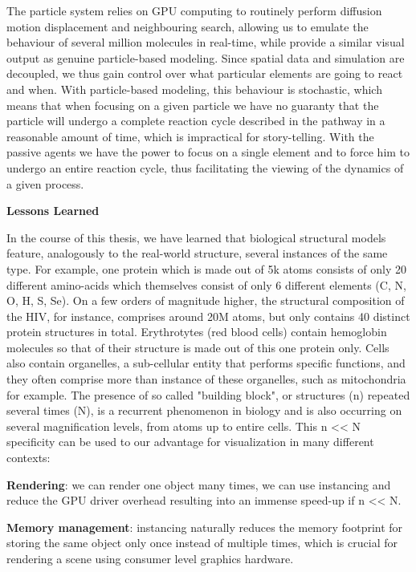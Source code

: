 The particle system relies on GPU computing to routinely perform diffusion motion displacement and neighbouring search, allowing us to emulate the behaviour of several million molecules in real-time, while provide a similar visual output as genuine particle-based modeling.
Since spatial data and simulation are decoupled, we thus gain control over what particular elements are going to react and when.
With particle-based modeling, this behaviour is stochastic, which means that when focusing on a given particle we have no guaranty that the particle will undergo a complete reaction cycle described in the pathway in a reasonable amount of time, which is impractical for story-telling.
With the passive agents we have the power to focus on a single element and to force him to undergo an entire reaction cycle, thus facilitating the viewing of the dynamics of a given process.

\textbf{Lessons Learned}

In the course of this thesis, we have learned that biological structural models feature, analogously to the real-world structure, several instances of the same type.
For example, one protein which is made out of 5k atoms consists of only 20 different amino-acids which themselves consist of only 6 different elements (C, N, O, H, S, Se). 
On a few orders of magnitude higher, the structural composition of the HIV, for instance, comprises around 20M atoms, but only contains 40 distinct protein structures in total.
Erythrotytes (red blood cells) contain hemoglobin molecules so that  of their structure is made out of this one protein only. 
Cells also contain organelles, a sub-cellular entity that performs specific functions, and they often comprise more than instance of these organelles, such as mitochondria for example. 
The presence of so called "building block", or structures (n) repeated several times (N), is a recurrent phenomenon in biology and is also occurring on several magnification levels, from atoms up to entire cells.
This n << N specificity can be used to our advantage for visualization in many different contexts:

\textbf{Rendering}: we can render one object many times, we can use instancing and reduce the GPU driver overhead resulting into an immense speed-up if n << N.

\textbf{Memory management}: instancing naturally reduces the memory footprint for storing the same object only once instead of multiple times, which is crucial for rendering a scene using consumer level graphics hardware.

